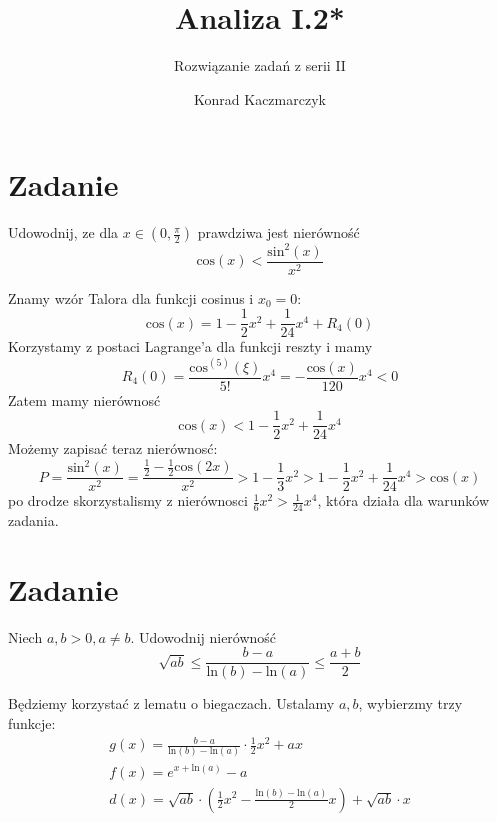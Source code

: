 \documentclass[12pt]{scrartcl}
\author{Konrad Kaczmarczyk}
\begin{document}
  \title{Analiza I.2*}
  \subtitle{Rozwiązanie zadań z serii II}
  \maketitle
    \section{Zadanie}
        
    \begin{zadanie}
        Udowodnij, ze dla $x \in \left ( 0, \frac{\pi }{2} \right )$ prawdziwa jest nierówność
        \[
            \text{cos} \left ( x \right ) < \frac{\text{sin}^2 \left ( x \right ) }{x^2}
        \]
    \end{zadanie}
        Znamy wzór Talora dla funkcji cosinus i $x_{0} = 0$:
        \[
            \text{cos} \left ( x \right ) = 1 - \frac{1}{2} x^2 + \frac{1}{24} x^4 + R_4(0) 
        \]
        Korzystamy z postaci Lagrange'a dla funkcji reszty i mamy
        \[
          R_4 (0) = \frac{\text{cos}^{(5)} \left ( \xi \right ) }{5!} x^4 = - \frac{\text{cos} \left ( x \right ) }{120} x^4 < 0
        \]
        Zatem mamy nierównosć
        \[
            \text{cos} \left ( x \right ) < 1 - \frac{1}{2} x^2 + \frac{1}{24} x^4
        \]
        Możemy zapisać teraz nierównosć:
        \[
            P = \frac{\text{sin}^2 \left ( x \right ) }{x^2} = \frac{\frac{1}{2} - \frac{1}{2} \text{cos} \left ( 2x \right ) }{x^2} > 1 - \frac{1}{3} x^2 > 1 - \frac{1}{2} x^2 + \frac{1}{24} x^4 > \text{cos} \left ( x \right )  
        \]
        po drodze skorzystalismy z nierównosci $\frac{1}{6} x^2 > \frac{1}{24} x^4$, która działa dla warunków zadania.
  \section{Zadanie}
      
    \begin{zadanie}
        Niech $a, b > 0, a \not = b$. Udowodnij nierówność
        \[
            \sqrt{ab} \leq \frac{b - a}{\text{ln} \left ( b \right ) - \text{ln} \left ( a \right ) } \leq \frac{a + b}{2} 
        \]
        
    \end{zadanie}
    
    Będziemy korzystać z lematu o biegaczach. Ustalamy $a,b$, wybierzmy trzy funkcje:
    \begin{gather*}
       g(x) = \frac{b - a}{ \text{ln} \left ( b \right ) - \text{ln} \left ( a \right ) } \cdot \frac{1}{2} x^2 + ax \\     
     f(x) = e^{x + \text{ln} \left ( a \right ) } - a \\
     d(x) = \sqrt{ab} \cdot \left ( \frac{1}{2} x^2 - \frac{\text{ln} \left ( b \right ) - \text{ln} \left ( a \right )  }{2} x \right ) + \sqrt{ab} \cdot x 
    \end{gather*}
    
\end{document}
